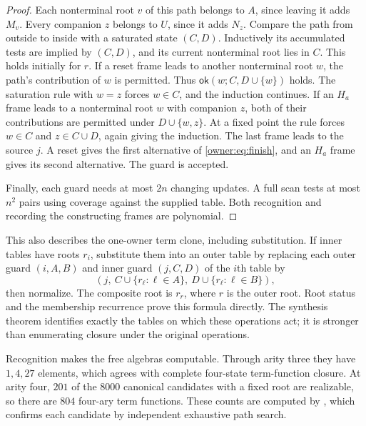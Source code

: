 \begin{proof}
Each nonterminal root $v$ of this path belongs to $A$, since leaving
it adds $M_v$. Every companion $z$ belongs to $U$, since it adds $N_z$.
Compare the path from outside to inside with a saturated state $(C,D)$.
Inductively its accumulated tests are implied by $(C,D)$, and its
current nonterminal root lies in $C$. This holds initially for $r$.
If a reset frame leads to another nonterminal root $w$, the path's
contribution of $w$ is permitted. Thus
$\mathsf{ok}(w;C,D\cup\{w\})$ holds. The saturation rule with
$w=z$ forces $w\in C$, and the induction continues. If an $H_a$
frame leads to a nonterminal root $w$ with companion $z$, both of
their contributions are permitted under $D\cup\{w,z\}$.
At a fixed point the rule forces $w\in C$ and $z\in C\cup D$,
again giving the induction. The last frame leads to the source $j$.
A reset gives the first alternative of \eqref{owner:eq:finish}, and
an $H_a$ frame gives its second alternative. The guard is accepted.

Finally, each guard needs at most $2n$ changing updates. A full scan
tests at most $n^2$ pairs using coverage against the supplied table.
Both recognition and recording the constructing frames are polynomial.
\end{proof}

This also describes the one-owner term clone, including substitution.
If inner tables have roots $r_i$, substitute them into an outer table
by replacing each outer guard $(i,A,B)$ and inner guard $(j,C,D)$ of
the $i$th table by
\[
 \left(j,\ C\cup\{r_\ell:\ell\in A\},\
             D\cup\{r_\ell:\ell\in B\}\right),
\]
then normalize. The composite root is $r_{r}$, where $r$ is the outer
root. Root status and the membership recurrence prove this formula
directly. The synthesis theorem identifies exactly the tables on which
these operations act; it is stronger than enumerating closure under
the original operations.

Recognition makes the free algebras computable. Through arity three
they have $1,4,27$ elements, which agrees with complete four-state
term-function closure. At arity four, $201$ of the $8000$ canonical
candidates with a fixed root are realizable, so there are $804$
four-ary term functions. These counts are computed by
, which confirms each candidate
by independent exhaustive path search.
